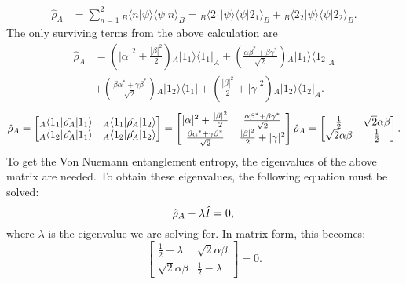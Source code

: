\begin{align}
\hat{\rho}_A &= \sum_{n=1}^{2} {}_B \langle n|\psi \rangle \langle \psi|n \rangle_B = {}_B\langle 2_1|\psi \rangle \langle \psi|2_1 \rangle_B + {}_B\langle 2_2|\psi \rangle \langle \psi|2_2 \rangle_B.
\end{align}
The only surviving terms from the above calculation are
\begin{align*}
\hat{\rho}_A &= \left( |\alpha|^2 + \frac{|\beta|^2}{2} \right) {}_A |1_1 \rangle \langle 1_1|_A
+ \left( \frac{\alpha \beta^* + \beta \gamma^*}{\sqrt{2}} \right) {}_A |1_1 \rangle \langle 1_2|_A \\
&+ \left( \frac{\beta \alpha^*+ \gamma \beta^*}{\sqrt{2}} \right) {}_A |1_2 \rangle \langle 1_1|
+ \left( \frac{|\beta|^2}{2} + |\gamma|^2 \right) {}_A |1_2 \rangle \langle 1_2|_A.
\end{align*}
\begin{equation}
\hat{\rho}_A = \begin{bmatrix} {}_A \langle 1_1 | \hat{\rho_A} | 1_1 \rangle & {}_A \langle 1_1 | \hat{\rho_A} | 1_2 \rangle \\ {}_A \langle 1_2 | \hat{\rho_A} | 1_1 \rangle & {}_A \langle 1_2 | \hat{\rho_A} | 1_2 \rangle \end{bmatrix} = \begin{bmatrix} |\alpha|^2 + \frac{|\beta|^2}{2} & \frac{\alpha \beta^* + \beta \gamma^*}{\sqrt{2}} \\ \frac{\beta \alpha^* + \gamma \beta^*}{\sqrt{2}} & \frac{|\beta|^2}{2} + |\gamma|^2 \end{bmatrix} \\
\hat{\rho}_A = \begin{bmatrix} \frac{1}{2} & \sqrt{2} \alpha \beta \\ \sqrt{2} \alpha \beta & \frac{1}{2} \end{bmatrix}.
\end{equation}
\noindent To get the Von Nuemann entanglement entropy, the eigenvalues of the above matrix are needed. To obtain these eigenvalues, the following equation must be solved:
\begin{equation}
\hat{\rho}_A - \lambda \hat{I} = 0, \\
\end{equation}
\noindent where $\lambda$ is the eigenvalue we are solving for. In matrix form, this becomes:
\begin{equation}
\begin{bmatrix} \frac{1}{2} - \lambda & \sqrt{2} \alpha \beta \\ \sqrt{2} \alpha \beta & \frac{1}{2} - \lambda \end{bmatrix} = 0.
\end{equation}
